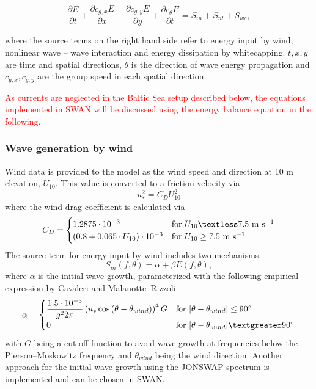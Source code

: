 \begin{equation}
 \frac{\partial E}{\partial t} + \frac{\partial c_{g,x} E}{\partial x} + \frac{ \partial c_{g,y} E}{\partial y} + \frac{\partial c_{\theta} E}{\partial t} = S_{in} + S_{nl} + S_{wc},
\end{equation}

where the source terms on the right hand side refer to energy input by wind, nonlinear wave -- wave interaction and energy dissipation by whitecapping. $t, x ,y$ are time and spatial directions, $\theta$ is the direction of wave energy propagation and $c_{g,x}, c_{g,y}$ are the group speed in each spatial direction. 

\textcolor{red}{As currents are neglected in the Baltic Sea setup described below, the equations implemented in SWAN will be discussed using the energy balance equation in the following. }

\subsubsection{Wave generation by wind}

Wind data is provided to the model as the wind speed and direction at 10 m elevation, $U_{10}$. This value is converted to a friction velocity via
\begin{equation}
 u_\ast^2 = C_D U_{10}^2
\end{equation}
where the wind drag coefficient is calculated via
\begin{equation}
 C_D = 
 \begin{cases}
  1.2875 \cdot 10^{-3} & \text{for } U_{10} \textless 7.5 \text{ m s}^{-1} \\
  (0.8 + 0.065 \cdot U_{10}) \cdot 10^{-3} & \text{for } U_{10} \ge 7.5 \text{ m s}^{-1} \\
 \end{cases}
\end{equation}
The source term for energy input by wind includes two mechanisms:
\begin{equation}
 S_{in} (f, \theta) = \alpha + \beta E(f,\theta),
\end{equation}
where $\alpha$ is the initial wave growth, parameterized with the following empirical expression by Cavaleri and Malanotte--Rizzoli
\begin{equation}
 \alpha = 
 \begin{cases}
  \dfrac{1.5 \cdot 10^{-3}}{g^2 2 \pi} \left(u_\ast \cos{(\theta - \theta_{wind})}\right)^4 G & \text{for } |\theta - \theta_{wind}| \le 90^\circ  \\
  0 & \text{for } |\theta - \theta_{wind}| \textgreater 90^\circ  \\
 \end{cases}
\end{equation}
with $G$ being a cut-off function to avoid wave growth at frequencies below the Pierson--Moskowitz frequency and $\theta_{wind}$ being the wind direction. Another approach for the initial wave growth using the JONSWAP spectrum is implemented and can be chosen in SWAN.

